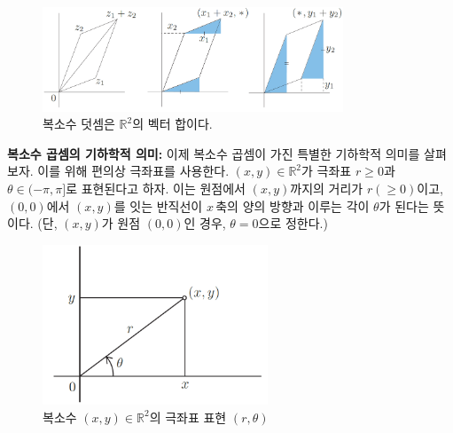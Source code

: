 \begin{figure}[!h]
\begin{center}
\includegraphics[width=0.8\textwidth]{./SaltChapter/figs/fig-1-3}
\end{center}
\caption{복소수 덧셈은 $\mathbb R^2$의 벡터 합이다.}
\label{fig-1-3}
\end{figure}

{\bf  복소수 곱셈의 기하학적 의미: }
이제 복소수 곱셈이 가진 특별한 기하학적 의미를 살펴보자.
이를 위해 편의상 극좌표를 사용한다.
$(x,y)\in\mathbb R^2$가 극좌표 $r\ge 0$과 $\theta\in(-\pi,\pi]$로 표현된다고 하자.
이는 원점에서 $(x,y)$까지의 거리가 $r(\ge0)$이고,
$(0,0)$에서 $(x,y)$를 잇는 반직선이 $x\,$축의 양의 방향과 이루는 각이 $\theta$가 된다는 뜻이다.
(단, $(x,y)$가 원점 $(0,0)$인 경우, $\theta=0$으로 정한다.)

\begin{figure}[!h]
\begin{center}
\includegraphics[width=0.6\textwidth]{./SaltChapter/figs/fig-1-4}
\end{center}
\caption{복소수 $(x,y)\in\mathbb R^2$의 극좌표 표현 $(r, \theta)$}
\label{fig-1-4}
\end{figure}

